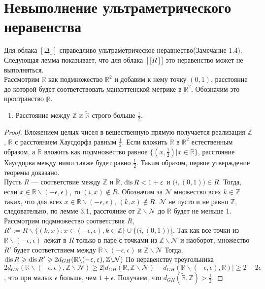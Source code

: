
\section{Невыполнение ультраметрического неравенства}
Для облака $[\Delta_{1}]$ справедливо ультраметрическое неравнество(Замечание
1.4). Следующая лемма показывает, что для облака $[\mathbb[R]]$
это неравенство может не выполняться. \\
Рассмотрим $\mathbb{R}$ как подмножество
$\mathbb{R}^2$ и добавим к нему точку $(0,1)$, расстояние до которой будет
соответствовать манхэттенской метрике в $\mathbb{R}^2$. Обозначим это
пространство $\widetilde{\mathbb{R}}$.
\begin{theorem}
\begin{enumerate}
 $\mathbb{Z}$ и $\widetilde{\mathbb{R}}$ находятся от $\mathbb{R}$
на расстоянии\\ не большем $\frac 1 2$.
\item Расстояние между $\mathbb{Z}$ и $\widetilde{\mathbb{R}}$ строго
больше $\frac 1 2$.
\end{enumerate}
\end{theorem}
\begin{proof}
Вложением целых чисел в вещественную прямую получается реализация $\mathbb{Z}$, $\mathbb{R}$ с расстоянием Хаусдорфа равным $\frac 1 2$.
Если вложить $\widetilde{\mathbb{R}}$ в $\mathbb{R}^{2}$ естественным образом, а $\mathbb{R}$ вложить как подмножество равное $\{(x, \frac1 2 )|x\in \mathbb{R}\}$,
расстояние Хаусдорва между ними также будет равно $\frac 1 2$. Таким образом, первое утверждение теоремы доказано. \\
Пусть $R$ --- соответствие
между $\mathbb{Z}$ и $\widetilde{\mathbb{R}}$, $\operatorname{dis} R < 1 + \upvarepsilon$ и
$\big(i, (0,1)\big) \in R$. Тогда, если
$x \in \mathbb{R}\backslash(-\epsilon, \epsilon)$, то $(i, x) \notin R$.
Обозначим за $\mathcal{N}$ множество всех $k \in \mathbb{Z}$ таких, что для всех
$x \in \mathbb{R}\backslash(-\epsilon, \epsilon)$, $(k,x) \notin R$.
$\mathcal{N}$ не пусто и не равно $\mathbb{Z}$, следовательно, по лемме 3.1,
расстояние от $\mathbb{Z} \backslash \mathcal{N}$ до $\mathbb{R}$ будет не
меньше 1. Рассмотрим подмножество соответствия $R$,
$R' := R \backslash \{(k,x): x\in (-\epsilon, \epsilon), k \in \mathbb{Z}\} \cup \{\big(i, (0,1)\big)\}$.
Так как все точки из $\mathbb{R}\backslash(-\epsilon, \epsilon)$ лежат в $R$
только в паре с точками из $ \mathbb{Z} \backslash \mathcal{N}$ и наоборот,
множество $R'$ будет соответствием между
$\mathbb{R}\backslash(-\epsilon, \epsilon)$ и
$ \mathbb{Z} \backslash \mathcal{N}$  Тогда,
$\operatorname{dis} R \geqslant \operatorname{dis} R' \geqslant 2d_{GH}(\mathbb{R}\backslash(-\upvarepsilon, \upvarepsilon), \mathbb{Z} \backslash \mathcal{N})$
По неравенству треугольника
$2d_{GH}(\mathbb{R}\backslash(-\epsilon, \epsilon), \mathbb{Z} \backslash \mathcal{N}) \ge 2|d_{GH}(\mathbb{R}, \mathbb{Z} \backslash \mathcal{N}) - d_{GH}(\mathbb{R}\backslash(-\epsilon, \epsilon), \mathbb{R})| \ge 2 - 2\epsilon$,
что при малых $\epsilon$ больше, чем $1 + \epsilon$. Получаем, что
$d_{GH}(\widetilde{\mathbb{R}}, \mathbb{Z}) > \frac{1}{2}$.
\end{proof}
